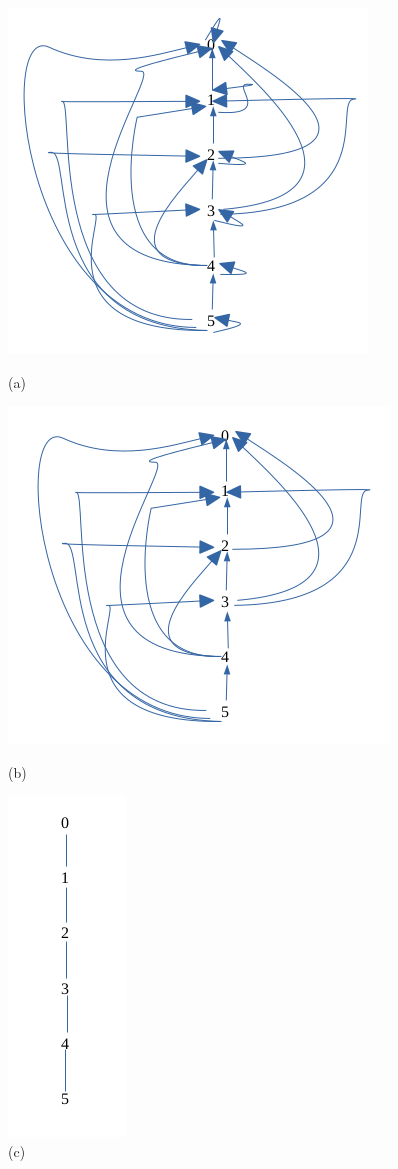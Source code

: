 \documentclass[a4 paper]{article}
\numberwithin{equation}{section}
\newcommand{\0}{\mathbf{0}}
\begin{document}
\begin{figure}[htp]
    \centering
	\includegraphics[scale=0.5]{a.png}
	\caption{(a)}
	\label{fig: hasse diagram}
	
    \centering
	\includegraphics[scale=0.5]{b.png}
	\caption{(b)}
	\label{fig: hasse diagram}

    \centering
	\includegraphics[scale=0.5]{c.png}
	\caption{(c)}
	\label{fig: hasse diagram}
\end{figure}
\end{document}
